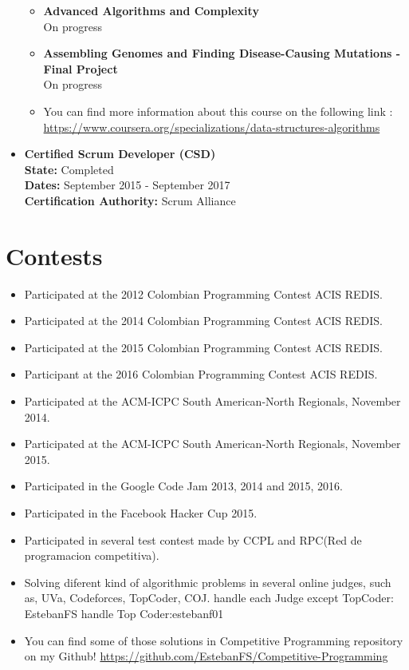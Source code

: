 \documentclass[a4paper,10pt]{article} %
\begin{document}
\begin{itemize}
\begin{itemize}
\item \textbf{Advanced Algorithms and Complexity}\\
On progress\\
\item \textbf{Assembling Genomes and Finding Disease-Causing Mutations - Final Project}\\
On progress\\
\item You can find more information about this course on the following link : \href {Data Structures And Algorithms Specialization}{https://www.coursera.org/specializations/data-structures-algorithms}
\end{itemize}
\item \textbf{Certified Scrum Developer (CSD)}\\
\textbf{State:} Completed\\
\textbf{Dates:} September 2015 - September 2017\\
\textbf{Certification Authority:} Scrum Alliance\\
\end{itemize}



\section{Contests}
\begin{itemize}
 \item Participated at the 2012 Colombian Programming Contest ACIS REDIS.
 \item Participated at the 2014 Colombian Programming Contest ACIS REDIS.
 \item Participated at the 2015 Colombian Programming Contest ACIS REDIS.
 \item Participant at the 2016 Colombian Programming Contest ACIS REDIS.
 \item Participated at the ACM-ICPC South American-North Regionals, November 2014.
 \item Participated at the ACM-ICPC South American-North Regionals, November 2015.
 \item Participated in the Google Code Jam 2013, 2014 and 2015, 2016.
 \item Participated in the Facebook Hacker Cup 2015.
 \item Participated in several test contest made by CCPL and RPC(Red de programacion competitiva).
 \item Solving diferent kind of algorithmic problems in several online judges, such as,
UVa, Codeforces, TopCoder, COJ.
handle each Judge except TopCoder: EstebanFS
handle Top Coder:estebanf01
\item You can find some of those solutions in Competitive Programming repository on my Github! \href{https://github.com/EstebanFS/Competitive-Programming}{https://github.com/EstebanFS/Competitive-Programming}
\end{itemize}
\end{document}
